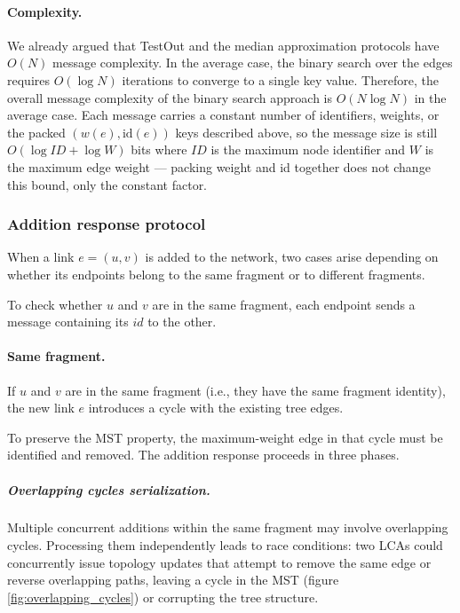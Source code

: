 \paragraph{Complexity.}
We already argued that TestOut and the median approximation protocols have $O(N)$ message complexity. In the average case, the binary search over the edges requires $O(\log N)$ iterations to converge to a single key value. Therefore, the overall message complexity of the binary search approach is $O(N \log N)$ in the average case. Each message carries a constant number of identifiers, weights, or the packed $(w(e), \mathrm{id}(e))$ keys described above, so the message size is still $O(\log ID + \log W)$ bits where $ID$ is the maximum node identifier and $W$ is the maximum edge weight — packing weight and id together does not change this bound, only the constant factor.

\subsubsection{Addition response protocol}
 
When a link $e = (u,v)$ is added to the network, two cases arise depending on whether
its endpoints belong to the same fragment or to different fragments.

To check whether $u$ and $v$ are in the same fragment, each endpoint sends a message
containing its $id$ to the other.
 
\paragraph{Same fragment.}
If $u$ and $v$ are in the same fragment (i.e., they have the same fragment identity), the
new link $e$ introduces a cycle with the existing tree edges.

To preserve the MST property, the maximum-weight edge in that cycle must be identified and
removed. The addition response proceeds in three phases.

\subparagraph{Overlapping cycles serialization.}
Multiple concurrent additions within the same fragment may involve overlapping cycles.
Processing them independently leads to race conditions: two LCAs could concurrently issue 
topology updates that attempt to remove the same edge or reverse overlapping paths,
leaving a cycle in the MST (figure \ref{fig:overlapping_cycles}) or corrupting the tree
structure.

